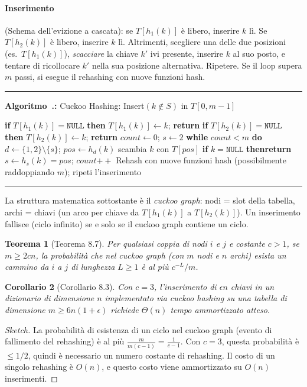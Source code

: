 \documentclass[12pt, a4paper, oneside]{book}
\newcounter{algocf}[chapter]
\renewcommand{\thealgocf}{\thechapter.\arabic{algocf}}
\newenvironment{algorithm}[1][H]{%
  \refstepcounter{algocf}%
  \par\medskip\noindent\rule{\linewidth}{0.4pt}\par\smallskip
}{%
  \par\smallskip\noindent\rule{\linewidth}{0.4pt}\par\medskip
}
\newcommand{\algcaption}[1]{\noindent\textbf{Algoritmo~\thealgocf:} #1\par\smallskip}
\newcommand{\While}[1]{\noindent\textbf{while} #1 \textbf{do}}
\newcommand{\If}[1]{\noindent\textbf{if} #1 \textbf{then}}
\newcommand{\Return}[1]{\noindent\textbf{return} #1}
\theoremstyle{plain}
\newtheorem{teorema}{Teorema}[chapter]
\newtheorem{corollario}[teorema]{Corollario}
\theoremstyle{definition}
\theoremstyle{remark}
\begin{document}
\paragraph{Inserimento} (Schema dell'evizione a cascata): se $T[h_1(k)]$ è libero, inserire $k$ lì. Se $T[h_2(k)]$ è libero, inserire $k$ lì. Altrimenti, scegliere una delle due posizioni (es.\ $T[h_1(k)]$), \emph{scacciare} la chiave $k'$ ivi presente, inserire $k$ al suo posto, e tentare di ricollocare $k'$ nella sua posizione alternativa. Ripetere. Se il loop supera $m$ passi, si esegue il rehashing con nuove funzioni hash.

\begin{algorithm}[H]
\algcaption{Cuckoo Hashing: Insert$(k \notin S)$ in $T[0, m-1]$}
\If{$T[h_1(k)] = \mathtt{NULL}$}{ $T[h_1(k)] \leftarrow k$; \Return\;}
\If{$T[h_2(k)] = \mathtt{NULL}$}{ $T[h_2(k)] \leftarrow k$; \Return\;}
$\mathit{count} \leftarrow 0$; $s \leftarrow 2$\;
\While{$\mathit{count} < m$}{
  $d \leftarrow \{1,2\} \setminus \{s\}$; $\mathit{pos} \leftarrow h_d(k)$\;
  scambia $k$ con $T[\mathit{pos}]$\;
  \If{$k = \mathtt{NULL}$}{\Return\;}
  $s \leftarrow h_s(k) = \mathit{pos}$; $\mathit{count} \mathrel{+\!\!+}$\;
}
Rehash con nuove funzioni hash (possibilmente raddoppiando $m$); ripeti l'inserimento\;
\end{algorithm}

La struttura matematica sottostante è il \emph{cuckoo graph}: nodi = slot della tabella, archi = chiavi (un arco per chiave da $T[h_1(k)]$ a $T[h_2(k)]$). Un inserimento fallisce (ciclo infinito) se e solo se il cuckoo graph contiene un ciclo.

\begin{teorema}[Teorema 8.7]
Per qualsiasi coppia di nodi $i$ e $j$ e costante $c > 1$, se $m \ge 2cn$, la probabilità che nel cuckoo graph (con $m$ nodi e $n$ archi) esista un cammino da $i$ a $j$ di lunghezza $L \ge 1$ è al più $c^{-L}/m$.
\end{teorema}

\begin{corollario}[Corollario 8.3]
Con $c = 3$, l'inserimento di $\epsilon n$ chiavi in un dizionario di dimensione $n$ implementato via cuckoo hashing su una tabella di dimensione $m \ge 6n(1+\epsilon)$ richiede $\Theta(n)$ tempo ammortizzato atteso.
\end{corollario}

\begin{proof}[Sketch]
La probabilità di esistenza di un ciclo nel cuckoo graph (evento di fallimento del rehashing) è al più $\frac{m}{m(c-1)} = \frac{1}{c-1}$. Con $c = 3$, questa probabilità è $\le 1/2$, quindi è necessario un numero costante di rehashing. Il costo di un singolo rehashing è $O(n)$, e questo costo viene ammortizzato su $O(n)$ inserimenti.
\end{proof}
\end{document}
